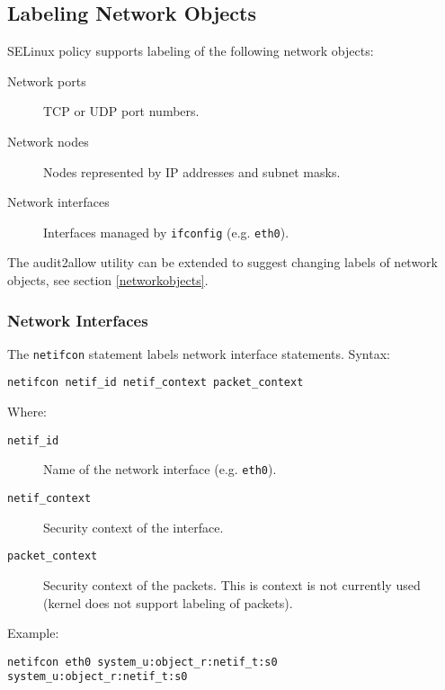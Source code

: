 \subsection{Labeling Network Objects}

SELinux policy supports labeling of the following network objects:
\begin{description}
    \item [Network ports] TCP or UDP port numbers.
    \item [Network nodes] Nodes represented by IP addresses and subnet masks.
    \item [Network interfaces] Interfaces managed by \texttt{ifconfig} (e.g.
        \texttt{eth0}).
\end{description}
The audit2allow utility can be extended to suggest changing labels of network
objects, see section \ref{networkobjects}.

\subsubsection{Network Interfaces}
The \texttt{netifcon} statement labels network interface statements. Syntax:
\begin{lstlisting}[language=te]
netifcon netif_id netif_context packet_context
\end{lstlisting}
Where:
\begin{description}
    \item [\texttt{netif\_id}] Name of the network interface (e.g.
        \texttt{eth0}).
    \item [\texttt{netif\_context}] Security context of the interface.
    \item [\texttt{packet\_context}] Security context of the packets. This is
        context is not currently used (kernel does not support labeling of
        packets).
\end{description}
Example:
\begin{lstlisting}[language=te]
netifcon eth0 system_u:object_r:netif_t:s0 system_u:object_r:netif_t:s0
\end{lstlisting}

